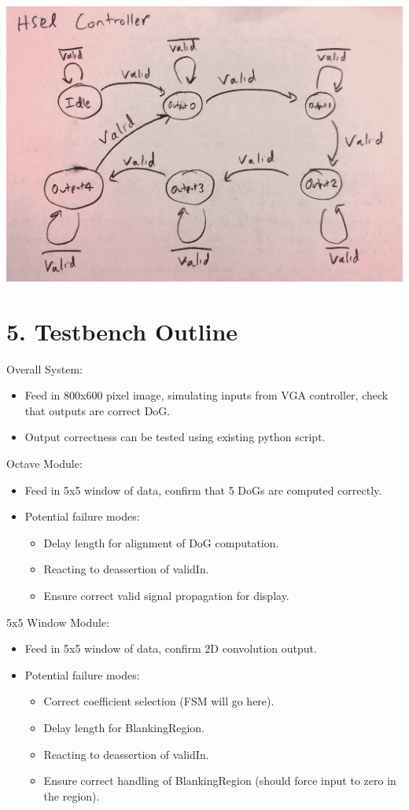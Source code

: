 \documentclass[11pt]{article}
\begin{document}
\noindent\includegraphics[width=\textwidth]{controllers/prochsel.png}

\section*{5. Testbench Outline}
Overall System:
\begin{itemize}
    \item Feed in 800x600 pixel image, simulating inputs from VGA controller, check that outputs are correct DoG.
    \item Output correctness can be tested using existing python script.
\end{itemize}

\noindent Octave Module:
\begin{itemize}
    \item Feed in 5x5 window of data, confirm that 5 DoGs are computed correctly.
    \item Potential failure modes:
        \begin{itemize}
            \item Delay length for alignment of DoG computation.
            \item Reacting to deassertion of validIn.
            \item Ensure correct valid signal propagation for display.
        \end{itemize}
\end{itemize}


\noindent 5x5 Window Module:
\begin{itemize}
    \item Feed in 5x5 window of data, confirm 2D convolution output.
    \item Potential failure modes:
        \begin{itemize}
            \item Correct coefficient selection (FSM will go here).
            \item Delay length for BlankingRegion.
            \item Reacting to deassertion of validIn.
            \item Ensure correct handling of BlankingRegion (should force input to zero in the region).
        \end{itemize}
\end{itemize}
\end{document}
